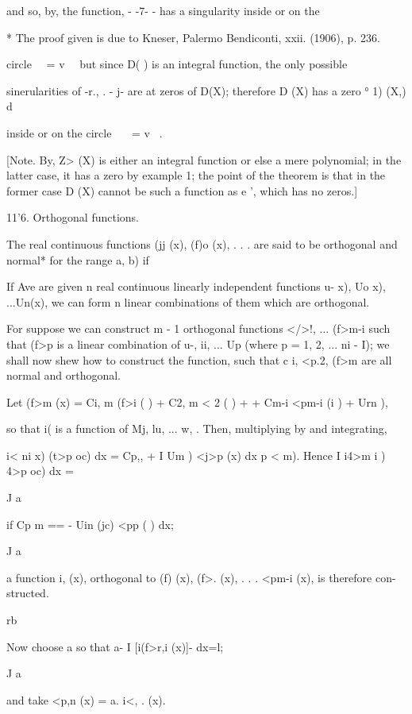 {and so, by, the function, - -7- - has a singularity inside or
on the

* The proof given is due to Kneser, Palermo Bendiconti, xxii. (1906),
p. 236.

%
%

circle \ \ = v~ \ but since D( ) is an integral function, the only
possible

sinerularities of -r., . - j- are at zeros of D(X); therefore D (X)
has a zero ° 1) (X,) d\

inside or on the circle \ \ \ = v~ .

[Note. By, Z> (X) is either an integral function or else a
mere polynomial; in the latter case, it has a zero by example
1; the point of the theorem is that in the former case D (X) cannot
be such a function as e ', which has no zeros.]

11'6. Orthogonal functions.

The real continuous functions (jj (x), (f)o (x), . . . are said to be
orthogonal and normal* for the range a, b) if

If Ave are given n real continuous linearly independent functions u-
x), Uo x), ...Un(x), we can form n linear combinations of them which
are orthogonal.

For suppose we can construct m - 1 orthogonal functions </>!, ...
(f>m-i such that (f>p is a linear combination of u-, ii, ... Up
(where p = 1, 2, ... ni - I); we shall now shew how to construct the
function, such that c i, <p.2,  (f>m are all normal and
orthogonal.

Let (f>m (x) = Ci, m (f>i ( ) + C2, m < 2 ( ) +  + Cm-i <pm-i (i )
+ Urn ),

so that i( is a function of Mj, lu, ... w, . Then, multiplying by and
integrating,

i< ni x) (t>p oc) dx = Cp,, + I Um ) <j>p (x) dx p < m). Hence I i4>m
i ) 4>p oc) dx =

J a

if Cp m == - Uin (jc) <pp ( ) dx;

J a

a function i, (x), orthogonal to (f) (x), (f>. (x), . . . <pm-i (x),
is therefore con- structed.

rb

Now choose a so that a- I [i(f>r,i (x)]- dx=l;

J a

and take <p,n (x) = a. i<, . (x).

}
